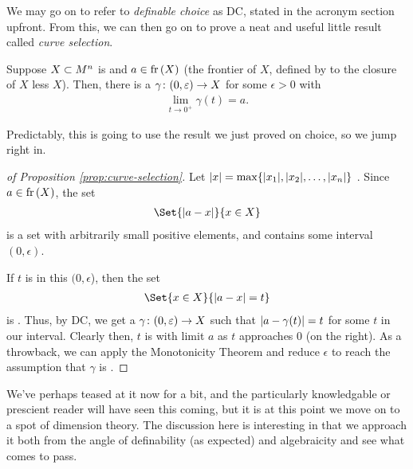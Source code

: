 We may go on to refer to \emph{definable choice} as DC, stated in the acronym section upfront. From this, we can then go on to prove a neat and useful little result called \emph{curve selection}.

\begin{proposition}
  \label{prop:curve-selection}
  Suppose $X \subset M^{n}$ is  and $a \in \operatorname{fr}\left(X\right)$ (the frontier of $X$, defined by to the closure of $X$ less $X$). Then, there is a \cont {} \inj $\gamma \colon (0, \varepsilon) \to X$ for some $\epsilon > 0$ with
  \begin{align*}
    \lim_{t \to 0^{+}} \gamma (t) = a.
  \end{align*}
\end{proposition}

Predictably, this is going to use the result we just proved on  choice, so we jump right in.

\begin{proof}[of Proposition \ref{prop:curve-selection}]
 Let $\vert x\vert = \max \{ \vert x_1\vert, \vert x_2\vert, \hdots, \vert x_n\vert \}$ . Since $a \in \operatorname{fr}\left(X\right)$, the set 
   \begin{align*}
     \Set{\abs{a - x}}{x \in X}
   \end{align*}
   is a  set with arbitrarily small positive elements, and contains some interval $(0, \epsilon)$.
   
   If $t$ is in this $(0, \epsilon$), then the set 
   \begin{align*}
     \Set{x \in X}{\abs{a - x} = t}
   \end{align*}
  is \inhb. Thus, by DC, we get a  $\gamma \colon (0, \varepsilon) \to X$ such that $\vert a - \gamma(t)\vert = t$ for some $t$ in our interval. Clearly then, $t$ is \inj with limit $a$ as $t$ approaches 0 (on the right). As a throwback, we can apply the Monotonicity Theorem and reduce $\epsilon$ to reach the assumption that $\gamma$ is \cont.
\end{proof}

We've perhaps teased at it now for a bit, and the particularly knowledgable or prescient reader will have seen this coming, but it is at this point we move on to a spot of dimension theory. The discussion here is interesting in that we approach it both from the angle of definability (as expected) and algebraicity and see what comes to pass.
